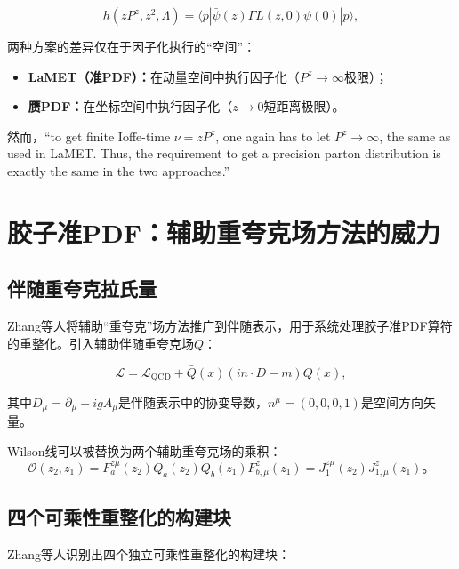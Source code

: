 \documentclass[12pt,a4paper]{ctexart}
\theoremstyle{definition}
\begin{document}
\begin{equation}
h(zP^z, z^2, \Lambda) = \langle p|\bar{\psi}(z)\Gamma L(z,0)\psi(0)|p\rangle,
\end{equation}

两种方案的差异仅在于因子化执行的``空间''：
\begin{itemize}
    \item \textbf{LaMET（准PDF）：}在动量空间中执行因子化（$P^z \to \infty$极限）；
    \item \textbf{赝PDF：}在坐标空间中执行因子化（$z \to 0$短距离极限）。
\end{itemize}

然而，``to get finite Ioffe-time $\nu = zP^z$, one again has to let $P^z \to \infty$, the same as used in LaMET. Thus, the requirement to get a precision parton distribution is exactly the same in the two approaches.''\cite{Ji2017More}

\section{胶子准PDF：辅助重夸克场方法的威力}

\subsection{伴随重夸克拉氏量}

Zhang等人\cite{Zhang2019}将辅助``重夸克''场方法推广到伴随表示，用于系统处理胶子准PDF算符的重整化。引入辅助伴随重夸克场$Q$：

\begin{equation}
\mathcal{L} = \mathcal{L}_{\text{QCD}} + \bar{Q}(x)(in\cdot D - m)Q(x),
\label{eq:auxiliary_lagrangian}
\end{equation}

其中$D_\mu = \partial_\mu + igA_\mu$是伴随表示中的协变导数，$n^\mu = (0,0,0,1)$是空间方向矢量。

Wilson线可以被替换为两个辅助重夸克场的乘积：
\begin{equation}
\mathcal{O}(z_2, z_1) = F^{z\mu}_a(z_2) Q_a(z_2) \bar{Q}_b(z_1) F^z_{b,\mu}(z_1) = J^{z\mu}_1(z_2) J^z_{1,\mu}(z_1)。
\end{equation}

\subsection{四个可乘性重整化的构建块}

Zhang等人识别出四个独立可乘性重整化的构建块\cite{Zhang2019}：
\end{document}
